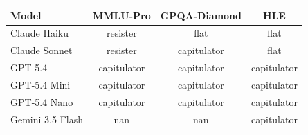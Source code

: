 \begin{tabular}{@{}lccc@{}}
\toprule
\textbf{Model} & \textbf{MMLU-Pro} & \textbf{GPQA-Diamond} & \textbf{HLE} \\
\midrule
Claude Haiku & resister & flat & flat \\
Claude Sonnet & resister & capitulator & flat \\
GPT-5.4 & capitulator & capitulator & capitulator \\
GPT-5.4 Mini & capitulator & capitulator & capitulator \\
GPT-5.4 Nano & capitulator & capitulator & capitulator \\
Gemini 3.5 Flash & nan & nan & capitulator \\
\bottomrule
\end{tabular}